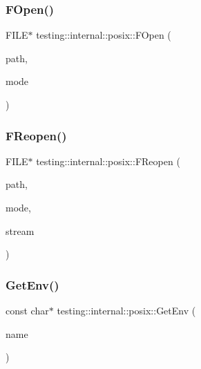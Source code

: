 \subsubsection{\texorpdfstring{F\+Open()}{FOpen()}}
{\footnotesize\ttfamily F\+I\+LE$\ast$ testing\+::internal\+::posix\+::\+F\+Open (\begin{DoxyParamCaption}\item[{const char $\ast$}]{path,  }\item[{const char $\ast$}]{mode }\end{DoxyParamCaption})\hspace{0.3cm}{\ttfamily [inline]}}

\mbox{\label{namespacetesting_1_1internal_1_1posix_a9ef6d089cdae03f9d9e0e6d379c40703}} 
\subsubsection{\texorpdfstring{F\+Reopen()}{FReopen()}}
{\footnotesize\ttfamily F\+I\+LE$\ast$ testing\+::internal\+::posix\+::\+F\+Reopen (\begin{DoxyParamCaption}\item[{const char $\ast$}]{path,  }\item[{const char $\ast$}]{mode,  }\item[{F\+I\+LE $\ast$}]{stream }\end{DoxyParamCaption})\hspace{0.3cm}{\ttfamily [inline]}}

\mbox{\label{namespacetesting_1_1internal_1_1posix_a1d5e3da5a27eed25986859fa83cafe95}} 
\subsubsection{\texorpdfstring{Get\+Env()}{GetEnv()}}
{\footnotesize\ttfamily const char$\ast$ testing\+::internal\+::posix\+::\+Get\+Env (\begin{DoxyParamCaption}\item[{const char $\ast$}]{name }\end{DoxyParamCaption})\hspace{0.3cm}{\ttfamily [inline]}}

